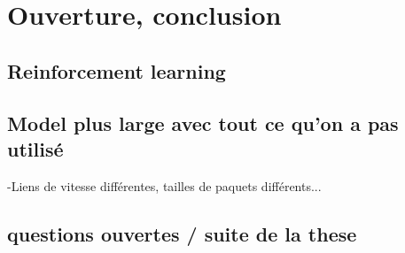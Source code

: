 \documentclass[a4paper,10pt]{article}
\begin{document}
\section{Ouverture, conclusion}

\subsection{Reinforcement learning}
\subsection{Model plus large avec tout ce qu'on a pas utilisé}
-Liens de vitesse différentes, tailles de paquets différents...
\subsection{questions ouvertes / suite de la these}
\end{document}
